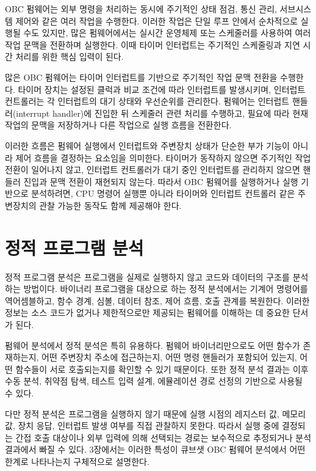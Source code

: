 \documentclass[master,korean,final]{kaist-ucs}
\begin{document}
OBC 펌웨어는 외부 명령을 처리하는 동시에 주기적인 상태 점검, 통신 관리, 서브시스템 제어와 같은 여러 작업을 수행한다. 이러한 작업은 단일 루프 안에서 순차적으로 실행될 수도 있지만, 많은 펌웨어에서는 실시간 운영체제 또는 스케줄러를 사용하여 여러 작업 문맥을 전환하며 실행한다. 이때 타이머 인터럽트는 주기적인 스케줄링과 지연 시간 처리를 위한 핵심 입력이 된다.

많은 OBC 펌웨어는 타이머 인터럽트를 기반으로 주기적인 작업 문맥 전환을 수행한다. 타이머 장치는 설정된 클럭과 비교 조건에 따라 인터럽트를 발생시키며, 인터럽트 컨트롤러는 각 인터럽트의 대기 상태와 우선순위를 관리한다. 펌웨어는 인터럽트 핸들러(interrupt handler)에 진입한 뒤 스케줄러 관련 처리를 수행하고, 필요에 따라 현재 작업의 문맥을 저장하거나 다른 작업으로 실행 흐름을 전환한다.

이러한 흐름은 펌웨어 실행에서 인터럽트와 주변장치 상태가 단순한 부가 기능이 아니라 제어 흐름을 결정하는 요소임을 의미한다. 타이머가 동작하지 않으면 주기적인 작업 전환이 일어나지 않고, 인터럽트 컨트롤러가 대기 중인 인터럽트를 관리하지 않으면 핸들러 진입과 문맥 전환이 재현되지 않는다. 따라서 OBC 펌웨어를 실행하거나 실행 기반으로 분석하려면, CPU 명령어 실행뿐 아니라 타이머와 인터럽트 컨트롤러 같은 주변장치의 관찰 가능한 동작도 함께 제공해야 한다.

\section{정적 프로그램 분석}

정적 프로그램 분석은 프로그램을 실제로 실행하지 않고 코드와 데이터의 구조를 분석하는 방법이다. 바이너리 프로그램을 대상으로 하는 정적 분석에서는 기계어 명령어를 역어셈블하고, 함수 경계, 심볼, 데이터 참조, 제어 흐름, 호출 관계를 복원한다. 이러한 정보는 소스 코드가 없거나 제한적으로만 제공되는 펌웨어를 이해하는 데 중요한 단서가 된다.

펌웨어 분석에서 정적 분석은 특히 유용하다. 펌웨어 바이너리만으로도 어떤 함수가 존재하는지, 어떤 주변장치 주소에 접근하는지, 어떤 명령 핸들러가 포함되어 있는지, 어떤 함수들이 서로 호출되는지를 확인할 수 있기 때문이다. 또한 정적 분석 결과는 이후 수동 분석, 취약점 탐색, 테스트 입력 설계, 에뮬레이션 경로 선정의 기반으로 사용될 수 있다.

다만 정적 분석은 프로그램을 실행하지 않기 때문에 실행 시점의 레지스터 값, 메모리 값, 장치 응답, 인터럽트 발생 여부를 직접 관찰하지 못한다. 따라서 실행 중에 결정되는 간접 호출 대상이나 외부 입력에 의해 선택되는 경로는 보수적으로 추정되거나 분석 결과에서 빠질 수 있다. 3장에서는 이러한 특성이 큐브샛 OBC 펌웨어 분석에서 어떤 한계로 나타나는지 구체적으로 설명한다.
\end{document}
